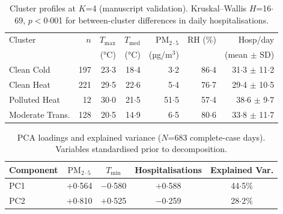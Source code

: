 \documentclass[12pt]{article}
\begin{document}
\begin{table}[ht]
\centering
\caption{Cluster profiles at $K$=4 (manuscript validation).
Kruskal--Wallis $H$=16${\cdot}$69, $p$$<$0${\cdot}$001 for
between-cluster differences in daily hospitalisations.}
\label{etab:clusters_k4}
\begin{tabular}{lrrrrrr}
\toprule
Cluster & $n$ & $T_\mathrm{max}$ & $T_\mathrm{med}$ &
  $\text{PM}_{2{\cdot}5}$ & RH (\%) & Hosp/day \\
  & & (°C) & (°C) & (µg/m$^3$) & & (mean $\pm$ SD) \\
\midrule
Clean Cold     & 197 & 23${\cdot}$3 & 18${\cdot}$4 &  3${\cdot}$2 & 86${\cdot}$4 & 31${\cdot}$3 $\pm$ 11${\cdot}$2 \\
Clean Heat     & 221 & 29${\cdot}$5 & 22${\cdot}$6 &  5${\cdot}$4 & 76${\cdot}$7 & 29${\cdot}$4 $\pm$ 10${\cdot}$5 \\
Polluted Heat  &  12 & 30${\cdot}$0 & 21${\cdot}$5 & 51${\cdot}$5 & 57${\cdot}$4 & 38${\cdot}$6 $\pm$ 9${\cdot}$7 \\
Moderate Trans. & 128 & 20${\cdot}$5 & 14${\cdot}$9 &  6${\cdot}$5 & 80${\cdot}$6 & 33${\cdot}$8 $\pm$ 11${\cdot}$7 \\
\bottomrule
\end{tabular}
\end{table}

\begin{table}[ht]
\centering
\caption{PCA loadings and explained variance ($N$=683 complete-case
days). Variables standardised prior to decomposition.}
\label{etab:pca}
\begin{tabular}{lcccc}
\toprule
Component & $\text{PM}_{2{\cdot}5}$ & $T_\mathrm{min}$ & Hospitalisations & Explained Var. \\
\midrule
PC1 & $+$0${\cdot}$564  & $-$0${\cdot}$580 & $+$0${\cdot}$588 & 44${\cdot}$5\% \\
PC2 & $+$0${\cdot}$810  & $+$0${\cdot}$525 & $-$0${\cdot}$259 & 28${\cdot}$2\% \\
\bottomrule
\end{tabular}
\end{table}
\end{document}
